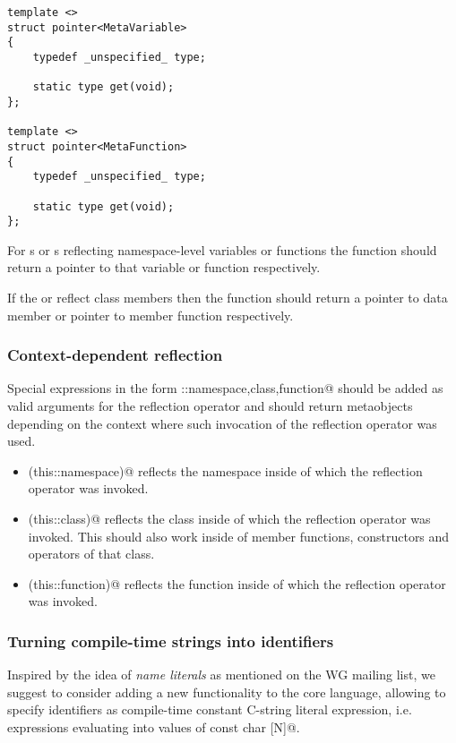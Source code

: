 \begin{verbatim}
template <>
struct pointer<MetaVariable>
{
	typedef _unspecified_ type;

	static type get(void);
};

template <>
struct pointer<MetaFunction>
{
	typedef _unspecified_ type;

	static type get(void);
};
\end{verbatim}

For s or s reflecting namespace-level variables or functions
the \verb@get@ function should return a pointer to that variable or function respectively.

If the  or  reflect class members then the \verb@get@ function
should return a pointer to data member or pointer to member function respectively.

\subsubsection{Context-dependent reflection}

Special expressions in the form \verb@this::{namespace,class,function}@ should be added
as valid arguments for the reflection operator and should return metaobjects depending
on the context where such invocation of the reflection operator was used.

\begin{itemize}
\item{\verb@mirrored(this::namespace)@} reflects the namespace inside of which the reflection
operator was invoked.
\item{\verb@mirrored(this::class)@} reflects the class inside of which the reflection
operator was invoked. This should also work inside of member functions, constructors and operators
of that class.
\item{\verb@mirrored(this::function)@} reflects the function inside of which the reflection
operator was invoked.
\end{itemize}


\subsubsection{Turning compile-time strings into identifiers}

Inspired by the idea of {\em name literals} as mentioned on the WG mailing list,
we suggest to consider adding a new functionality to the core language, allowing to specify
identifiers as compile-time constant C-string literal expression, i.e. expressions
evaluating into values of \verb@constexpr const char [N]@.

